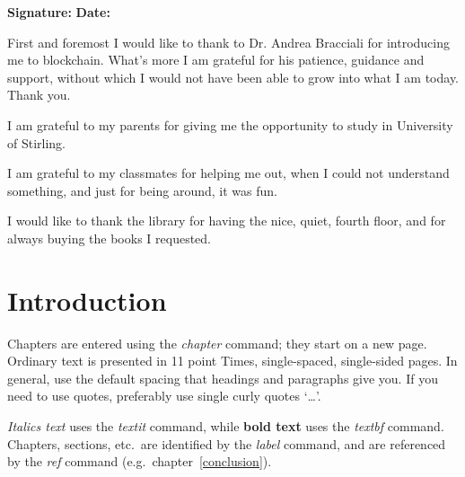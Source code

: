\documentclass[a4paper,11pt]{report}
\begin{document}
\bigskip

{\bf Signature:} \hspace{20em} {\bf Date:}




First and foremost I would like to thank to Dr. Andrea Bracciali for introducing me to blockchain. What's more I am grateful for his patience, guidance and support, without which I would not have been able to grow into what I am today. Thank you.

I am grateful to my parents for giving me the opportunity to study in University of Stirling. 

I am grateful to my classmates for helping me out, when I could not understand something, and just for being around, it was fun. 

I would like to thank the library for having the nice, quiet, fourth floor, and for always buying the books I requested. 


\tableofcontents

\listoffigures                  %


\clearpage


\setcounter{page}{1}



\chapter{Introduction}

\label{introduction}

Chapters are entered using the \textit{{\bs}chapter} command; they start on a
new page. Ordinary text is presented in 11 point Times, single-spaced,
single-sided pages. In general, use the default spacing that headings and
paragraphs give you. If you need to use quotes, preferably use single curly
quotes `\ldots'.

\textit{Italics text} uses the \textit{{\bs}textit} command, while \textbf{bold
text} uses the \textit{{\bs}textbf} command. Chapters, sections, etc.\ are
identified by the \textit{{\bs}label} command, and are referenced by the
\textit{{\bs}ref} command (e.g.\ chapter~\ref{conclusion}).
\end{document}
